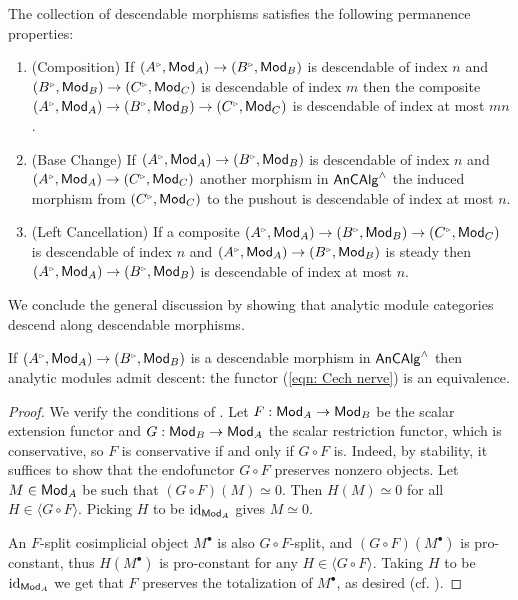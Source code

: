 \begin{proposition}\label{prop: permanence of descendable morphisms}
    The collection of descendable morphisms satisfies the following permanence properties: 
    \begin{enumerate}
        \item (Composition) If $(A^{\tri},\Mod_{A})\to (B^{\tri},\Mod_{B})$ is descendable of index $n$ and $(B^{\tri},\Mod_{B})\to (C^{\tri},\Mod_{C})$ is descendable of index $m$ then the composite $(A^{\tri},\Mod_{A})\to (B^{\tri},\Mod_{B})\to (C^{\tri},\Mod_{C})$ is descendable of index at most $mn$. 
        \item (Base Change) If $(A^{\tri},\Mod_{A})\to (B^{\tri},\Mod_{B})$ is descendable of index $n$ and $(A^{\tri},\Mod_{A})\to (C^{\tri},\Mod_{C})$ another morphism in $\mathsf{An}\mathsf{CAlg}^{\wedge}$ the induced morphism from $(C^{\tri},\Mod_{C})$ to the pushout is descendable of index at most $n$. 
        \item (Left Cancellation) If a composite $(A^{\tri},\Mod_{A})\to (B^{\tri},\Mod_{B})\to (C^{\tri},\Mod_{C})$ is descendable of index $n$ and $(A^{\tri},\Mod_{A})\to (B^{\tri},\Mod_{B})$ is steady then $(A^{\tri},\Mod_{A})\to (B^{\tri},\Mod_{B})$ is descendable of index at most $n$. 
    \end{enumerate}
\end{proposition}
We conclude the general discussion by showing that analytic module categories descend along descendable morphisms.
\begin{theorem}\label{thm: descent for descendable morphisms}
    If $(A^{\tri},\Mod_{A})\to(B^{\tri},\Mod_{B})$ is a descendable morphism in $\mathsf{An}\mathsf{CAlg}^{\wedge}$ then analytic modules admit descent: the functor (\ref{eqn: Cech nerve}) is an equivalence. 
\end{theorem}
\begin{proof}
    We verify the conditions of . Let $F:\mathsf{Mod}_{A}\to\mathsf{Mod}_{B}$ be the scalar extension functor and $G:\mathsf{Mod}_{B}\to\mathsf{Mod}_{A}$ the scalar restriction functor, which is conservative, so $F$ is conservative if and only if $G\circ F$ is. Indeed, by stability, it suffices to show that the endofunctor $G\circ F$ preserves nonzero objects. Let $M\in\mathsf{Mod}_{A}$ be such that $(G\circ F)(M)\simeq0$. Then $H(M)\simeq0$ for all $H\in\langle G\circ F\rangle$. Picking $H$ to be $\mathrm{id}_{\mathsf{Mod}_{A}}$ gives $M\simeq0$. 

    An $F$-split cosimplicial object $M^{\bullet}$ is also $G\circ F$-split, and $(G\circ F)(M^{\bullet})$ is pro-constant, thus $H(M^{\bullet})$ is pro-constant for any $H\in\langle G\circ F\rangle$. Taking $H$ to be $\mathrm{id}_{\mathsf{Mod}_{A}}$ we get that $F$ preserves the totalization of $M^{\bullet}$, as desired (cf. \cite[Ex. 3.11]{MatthewGalois}).
\end{proof}
